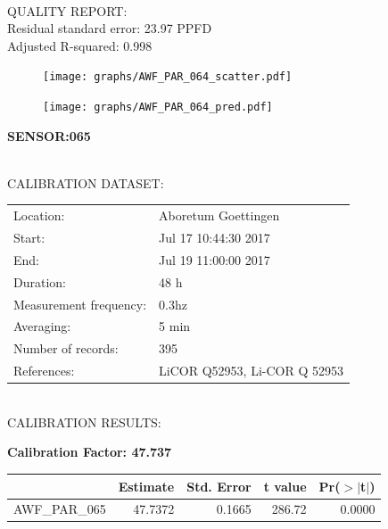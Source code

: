 \documentclass[oneside]{report}
\begin{document}
\hrulefill\\
QUALITY REPORT:\\
Residual standard error: 23.97 PPFD\\
Adjusted R-squared: 0.998



\begin{figure}[H]
  \centering
  \texttt{[image: graphs/AWF\_PAR\_064\_scatter.pdf]}
\end{figure}




\begin{figure}[H]
  \centering
  \texttt{[image: graphs/AWF\_PAR\_064\_pred.pdf]}
\end{figure}

\pagebreak


\begin{center}
\large{\textbf{SENSOR:065}}\\
\end{center}

\hrulefill\\
CALIBRATION DATASET:\\
\begin{table}[h!]
  \centering
  \label{tab:table1}
  \begin{tabular}{ll}
    Location: & Aboretum Goettingen\\ 
    
    
    Start:  & Jul 17 10:44:30 2017 \\
    End:   & Jul 19 11:00:00 2017\\ 
    Duration: & 48 h\\
    Measurement frequency: & 0.3hz\\
    Averaging:  &5 min\\
    Number of records: & 395 \\
    References: & LiCOR Q52953, Li-COR Q 52953 \\
  \end{tabular}
\end{table}

\hrulefill\\
CALIBRATION RESULTS:\\


\begin{center}
\textbf{\large{Calibration Factor: 47.737}}\\
\end{center}
\begin{table}[ht]
\centering
\begin{tabular}{rrrrr}
  \hline
 & Estimate & Std. Error & t value & Pr($>$$|$t$|$) \\ 
  \hline
AWF\_PAR\_065 & 47.7372 & 0.1665 & 286.72 & 0.0000 \\ 
   \hline
\end{tabular}
\end{table}
\end{document}
